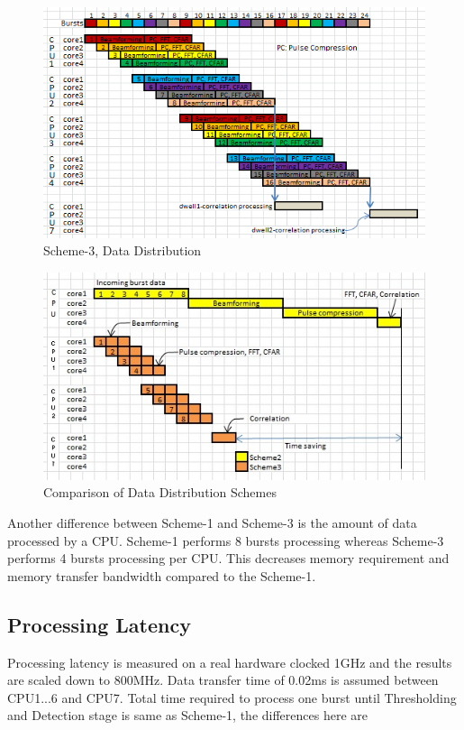 \begin{figure}[h!]
	\centering
	\includegraphics[width=140mm]{figures/scheme4_data_distribution.png}
	\caption{Scheme-3, Data Distribution}
	\label{fig:mm:scheme4_data_distribution}
\end{figure}

\begin{figure}[h!]
	\centering
	\includegraphics[]{figures/scheme4_comparison}
	\caption{Comparison of Data Distribution Schemes}
	\label{fig:mm:scheme4_comparison}
\end{figure}

Another difference between Scheme-1 and Scheme-3 is the amount of data processed by a CPU. Scheme-1 performs 8 bursts processing whereas Scheme-3 performs 4 bursts processing per CPU. This decreases memory requirement and memory transfer bandwidth compared to the Scheme-1.

\subsection{Processing Latency}
\label{ss:mm:scheme4:latency}
Processing latency is measured on a real hardware clocked 1GHz and the results are scaled down to 800MHz. Data transfer time of 0.02ms is assumed between CPU1...6 and CPU7. Total time required to process one burst until Thresholding and Detection stage is same as Scheme-1, the differences here are 

